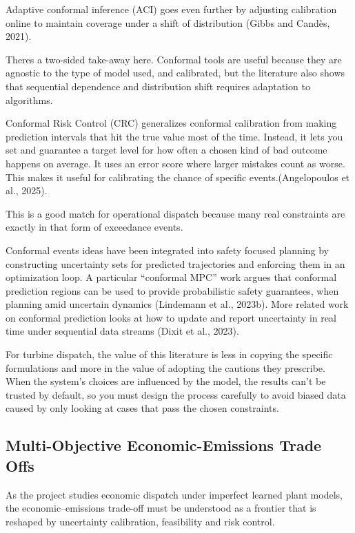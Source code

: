 \documentclass[11pt]{article}
\begin{document}
Adaptive conformal inference (ACI) goes even further by adjusting
calibration online to maintain coverage under a shift of distribution
(Gibbs and Candès, 2021).

Theres a two-sided take-away here. Conformal tools are useful because
they are agnostic to the type of model used, and calibrated, but the
literature also shows that sequential dependence and distribution shift
requires adaptation to algorithms.

Conformal Risk Control (CRC) generalizes conformal calibration from
making prediction intervals that hit the true value most of the time.
Instead, it lets you set and guarantee a target level for how often a
chosen kind of bad outcome happens on average. It uses an error score
where larger mistakes count as worse. This makes it useful for
calibrating the chance of specific events.(Angelopoulos et al., 2025).

This is a good match for operational dispatch because many real
constraints are exactly in that form of exceedance events.

Conformal events ideas have been integrated into safety focused planning
by constructing uncertainty sets for predicted trajectories and
enforcing them in an optimization loop. A particular ``conformal MPC''
work argues that conformal prediction regions can be used to provide
probabilistic safety guarantees, when planning amid uncertain dynamics
(Lindemann et al., 2023b). More related work on conformal prediction
looks at how to update and report uncertainty in real time under
sequential data streams (Dixit et al., 2023).

For turbine dispatch, the value of this literature is less in copying
the specific formulations and more in the value of adopting the cautions
they prescribe. When the system's choices are influenced by the model,
the results can't be trusted by default, so you must design the process
carefully to avoid biased data caused by only looking at cases that pass
the chosen constraints.

\subsection{Multi-Objective Economic-Emissions Trade
Offs}\label{multi-objective-economic-emissions-trade-offs}

As the project studies economic dispatch under imperfect learned plant
models, the economic--emissions trade-off must be understood as a
frontier that is reshaped by uncertainty calibration, feasibility and
risk control.
\end{document}
